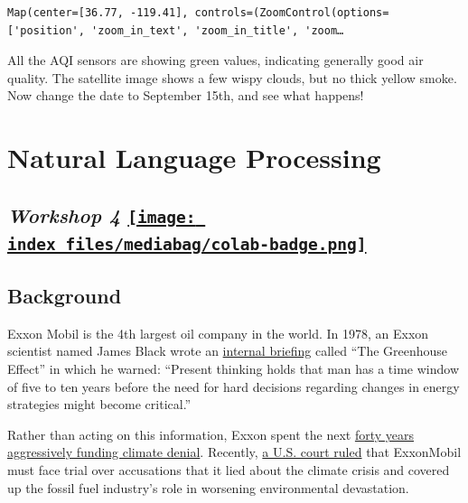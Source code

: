\documentclass[
  letterpaper,
  DIV=11,
  numbers=noendperiod]{scrreprt}
\begin{document}
\begin{verbatim}
Map(center=[36.77, -119.41], controls=(ZoomControl(options=['position', 'zoom_in_text', 'zoom_in_title', 'zoom…
\end{verbatim}

All the AQI sensors are showing green values, indicating generally good
air quality. The satellite image shows a few wispy clouds, but no thick
yellow smoke. Now change the date to September 15th, and see what
happens!


\hypertarget{natural-language-processing}{%
\chapter{Natural Language
Processing}\label{natural-language-processing}}

\hypertarget{workshop-4-open-in-colab}{%
\section[\emph{Workshop 4} ]{\texorpdfstring{\emph{Workshop 4}
\href{https://colab.research.google.com/github/oballinger/QM2/blob/main/notebooks/W04.\%20Natural\%20Language\%20Processing.ipynb}{\protect\texttt{[image: index\_files/mediabag/colab-badge.png]}}}{Workshop 4 Open In Colab}}\label{workshop-4-open-in-colab}}

\hypertarget{background-1}{%
\section{Background}\label{background-1}}

Exxon Mobil is the 4th largest oil company in the world. In 1978, an
Exxon scientist named James Black wrote an
\href{https://insideclimatenews.org/documents/james-black-1977-presentation/}{internal
briefing} called ``The Greenhouse Effect'' in which he warned: ``Present
thinking holds that man has a time window of five to ten years before
the need for hard decisions regarding changes in energy strategies might
become critical.''

Rather than acting on this information, Exxon spent the next
\href{https://news.harvard.edu/gazette/story/2021/09/oil-companies-discourage-climate-action-study-says/}{forty
years aggressively funding climate denial}. Recently,
\href{https://www.theguardian.com/environment/2022/may/24/exxon-trial-climate-crimes-fossil-fuels-global-heating}{a
U.S. court ruled} that ExxonMobil must face trial over accusations that
it lied about the climate crisis and covered up the fossil fuel
industry's role in worsening environmental devastation.
\end{document}
